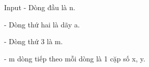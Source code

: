 Input
- Dòng đầu là n.  

   - Dòng thứ hai là dãy a.  

   - Dòng thứ 3 là m.  

   - m dòng tiếp theo mỗi dòng là 1 cặp số x, y.